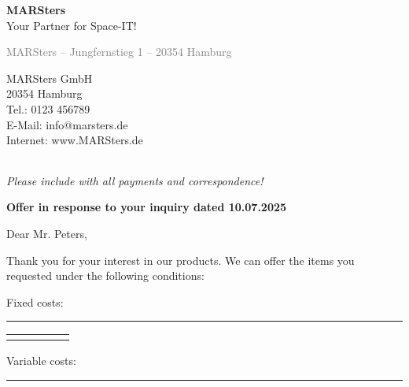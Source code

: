 \documentclass[12pt,a4paper]{article}
\begin{document}
\noindent
\raggedleft
\Huge\textbf{MARSters} \\[0.3em]
\large Your Partner for Space-IT! \\
\vspace{2em}
\begin{minipage}[t]{0.5\textwidth}
{\small \textcolor{gray}{MARSters – Jungfernstieg 1 – 20354 Hamburg}} \\[1em]

\end{minipage}
\hfill
\begin{minipage}[t]{0.45\textwidth}
\raggedleft
\vspace{1em}
MARSters GmbH \\
20354 Hamburg \\
Tel.: 0123 456789 \\
E-Mail: info@marsters.de \\
Internet: www.MARSters.de
\end{minipage}

\vspace{1.8em}

\begin{tabularx}{\textwidth}{@{}l X r@{}}

\end{tabularx}

\small\textit{Please include with all payments and correspondence!}

\vspace{2em}
{\raggedright
\textbf{Offer in response to your inquiry dated 10.07.2025}

Dear Mr. Peters,

Thank you for your interest in our products. We can offer the items you requested under the following conditions:
\par}
\vspace{1em}
\begin{flushleft}
Fixed costs: \\
\rule{\textwidth}{0.5pt}
\end{flushleft}

\renewcommand{\arraystretch}{1.4}
\begin{tabularx}{\textwidth}{|l|X|r|r|r|}
\hline
\rowcolor{gray!30}


\end{tabularx}
\vspace{8.5em}

\vspace{1em}
\begin{flushleft}
Variable costs: \\
\rule{\textwidth}{0.5pt}
\end{flushleft}
\end{document}
